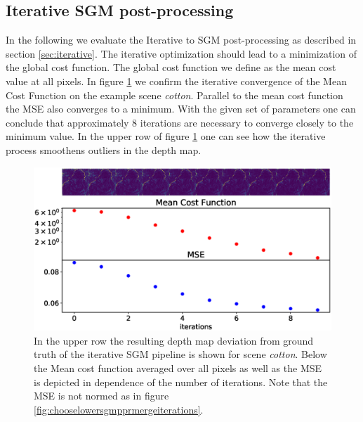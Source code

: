 \documentclass  [
  paper    = a4,
  BCOR     = 10mm,
  twoside,
  fontsize = 12pt,
  fleqn,
  toc      = bibnumbered,
  toc      = listofnumbered,
  numbers  = noendperiod,
  headings = normal,
  listof   = leveldown,
  version  = 3.03
]                                       {scrreprt}
\begin{document}
\subsection{Iterative SGM post-processing}
In the following we evaluate the Iterative to SGM post-processing as described in section \ref{sec:iterative}. The iterative optimization should lead to a minimization of the global cost function. The global cost function we define as the mean cost value at all pixels. In figure \ref{fig:iterationcostcotton} we confirm the iterative convergence of the Mean Cost Function on the example scene \textit{cotton}. Parallel to the mean cost function the MSE also converges to a minimum. With the given set of parameters one can conclude that approximately 8 iterations are necessary to converge closely to the minimum value. In the upper row of figure \ref{fig:iterationcostcotton} one can see how the iterative process smoothens outliers in the depth map.\\
\begin{figure}
	\centering
	\includegraphics[width=1\linewidth]{images/iteration_cost_cotton}
	\caption[Iterative Improvement of scene \textit{cotton}]{In the upper row the resulting depth map deviation from ground truth of the iterative SGM pipeline is shown for scene \textit{cotton}. Below the Mean cost function averaged over all pixels as well as the MSE is depicted in dependence of the number of iterations. Note that the MSE is not normed as in figure \ref{fig:chooselowersgmpprmergeiterations}.}
	\label{fig:iterationcostcotton}
\end{figure}
\end{document}
